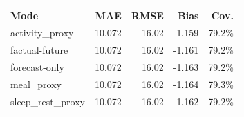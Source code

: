 \begin{tabular}{lrrrr}
\toprule
Mode & MAE & RMSE & Bias & Cov. \\
\midrule
activity\_proxy & 10.072 & 16.02 & -1.159 & 79.2\% \\
factual-future & 10.072 & 16.02 & -1.161 & 79.2\% \\
forecast-only & 10.072 & 16.02 & -1.163 & 79.2\% \\
meal\_proxy & 10.072 & 16.02 & -1.164 & 79.3\% \\
sleep\_rest\_proxy & 10.072 & 16.02 & -1.162 & 79.2\% \\
\bottomrule
\end{tabular}

